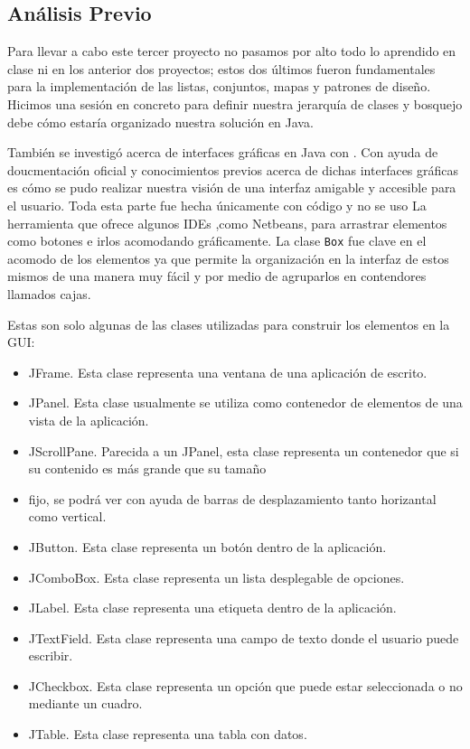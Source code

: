 \subsection*{Análisis Previo}

Para llevar a cabo este tercer proyecto no pasamos por alto todo lo aprendido en clase ni en los anterior
dos proyectos; estos dos últimos fueron fundamentales para la implementación de las listas, conjuntos, mapas
y patrones de diseño. Hicimos una sesión en concreto para definir nuestra jerarquía de clases y bosquejo debe
cómo estaría organizado nuestra solución en Java.

También se investigó acerca de interfaces gráficas en Java con . Con ayuda de doucmentación
oficial y conocimientos previos acerca de dichas interfaces gráficas es cómo se pudo realizar nuestra visión de
una interfaz amigable y accesible para el usuario. Toda esta parte fue hecha únicamente con código y no se uso La
herramienta que ofrece algunos IDEs ,como Netbeans, para arrastrar elementos como botones e irlos acomodando gráficamente.
La clase \texttt{Box} fue clave en el acomodo de los elementos ya que permite la organización en la interfaz de estos mismos
de una manera muy fácil y por medio de agruparlos en contendores llamados cajas.

Estas son solo algunas de las clases utilizadas para construir los elementos en la GUI:

\begin{itemize}
    \item JFrame. Esta clase representa una ventana de una aplicación de escrito.
    \item JPanel. Esta clase usualmente se utiliza como contenedor de elementos de una vista de la aplicación.
    \item JScrollPane. Parecida a un JPanel, esta clase representa un contenedor que si su contenido es más grande que su tamaño
    \item fijo, se podrá ver con ayuda de barras de desplazamiento tanto horizantal como vertical.
    \item JButton. Esta clase representa un botón dentro de la aplicación. 
    \item JComboBox. Esta clase representa un lista desplegable de opciones.
    \item JLabel. Esta clase representa una etiqueta dentro de la aplicación.
    \item JTextField. Esta clase representa una campo de texto donde el usuario puede escribir.
    \item JCheckbox. Esta clase representa un opción que puede estar seleccionada o no mediante un cuadro.
    \item JTable. Esta clase representa una tabla con datos.
  \end{itemize}

